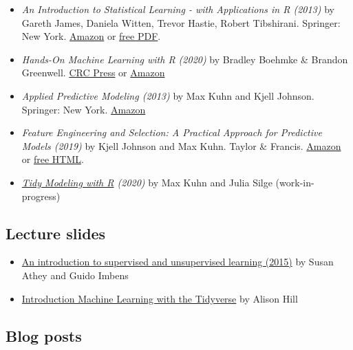 \documentclass[
]{book}
\begin{document}
\begin{itemize}
\item
  \emph{An Introduction to Statistical Learning - with Applications in R (2013)} by Gareth James, Daniela Witten, Trevor Hastie, Robert Tibshirani. Springer: New York. \href{https://www.amazon.com/Introduction-Statistical-Learning-Applications-Statistics/dp/1461471370}{Amazon} or \href{http://www-bcf.usc.edu/~gareth/ISL/}{free PDF}.
\item
  \emph{Hands-On Machine Learning with R (2020)} by Bradley Boehmke \& Brandon Greenwell. \href{https://www.routledge.com/Hands-On-Machine-Learning-with-R/Boehmke-Greenwell/p/book/9781138495685}{CRC Press} or \href{https://www.amazon.com/gp/product/1138495689?pf_rd_p=ab873d20-a0ca-439b-ac45-cd78f07a84d8&pf_rd_r=JBRX0ZJ1WFSR9T3JPTQE}{Amazon}
\item
  \emph{Applied Predictive Modeling (2013)} by Max Kuhn and Kjell Johnson. Springer: New York. \href{https://www.amazon.com/Applied-Predictive-Modeling-Max-Kuhn/dp/1461468485?SubscriptionId=0ENGV10E9K9QDNSJ5C82&tag=apm0a-20&linkCode=xm2&camp=2025&creative=165953&creativeASIN=1461468485}{Amazon}
\item
  \emph{Feature Engineering and Selection: A Practical Approach for Predictive Models (2019)} by Kjell Johnson and Max Kuhn. Taylor \& Francis. \href{http://www.feat.engineering/}{Amazon} or \href{http://www.feat.engineering/}{free HTML}.
\item
  \emph{\href{https://www.tmwr.org/}{Tidy Modeling with R} (2020)} by Max Kuhn and Julia Silge (work-in-progress)
\end{itemize}

\subsection{Lecture slides}\label{lecture-slides}

\begin{itemize}
\item
  \href{https://www.nber.org/econometrics_minicourse_2015/nber_slides11.pdf}{An introduction to supervised and unsupervised learning (2015)} by Susan Athey and Guido Imbens
\item
  \href{https://education.rstudio.com/blog/2020/02/conf20-intro-ml/}{Introduction Machine Learning with the Tidyverse} by Alison Hill
\end{itemize}

\subsection{Blog posts}\label{blog-posts}
\end{document}
